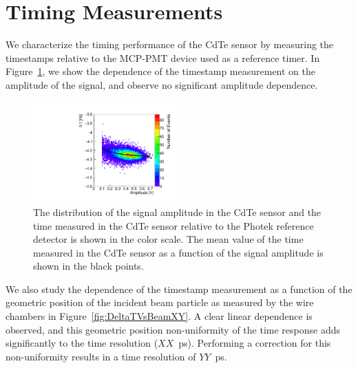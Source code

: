 
\section{Timing Measurements} 
\label{sec:timing} 

We characterize the timing performance of the CdTe sensor by measuring the timestamps
relative to the MCP-PMT device used as a reference timer. In 
Figure~\ref{fig:DeltaTVsAmplitude}, we show the dependence of the timestamp measurement 
on the amplitude of the signal, and observe no significant amplitude dependence.



\begin{figure}[htbp] 
\centering
\includegraphics[width=0.49\textwidth]{figures/100GeV_deltaTVsAmp.pdf} 
\caption{ The distribution of the signal amplitude in the CdTe sensor and 
the time measured in the CdTe sensor relative to the Photek reference detector
is shown in the color scale. The mean value of the time measured in the CdTe sensor 
as a function of the signal amplitude is shown in the black points. } 
\label{fig:DeltaTVsAmplitude} 
\end{figure} 


We also study the dependence of the timestamp measurement as a function of the geometric
position of the incident beam particle as measured by the wire chambers in 
Figure~\ref{fig:DeltaTVsBeamXY}. A clear linear dependence is observed, and this 
geometric position non-uniformity of the time response adds significantly to the 
time resolution ($XX$~ps). Performing a correction for this non-uniformity results
in a time resolution of $YY$~ps.

